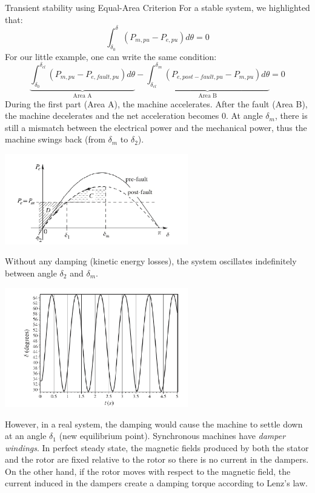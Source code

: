 \begin{frame}[allowframebreaks]{Transient stability using Equal-Area Criterion}
For a stable system, we highlighted that:
$$\int_{\delta_0}^{\delta} \left(P_{m,pu}-P_{e,pu}\right) d\theta = 0$$
For our little example, one can write the same condition:
$$\underbrace{\int_{\delta_0}^{\delta_{cl}} \left(P_{m,pu}-P_{e,fault,pu}\right) d\theta}_{\text{Area A}} - \underbrace{\int_{\delta_{cl}}^{\delta_{m}} \left(P_{e,post-fault,pu}-P_{m,pu}\right) d\theta}_{\text{Area B}} = 0$$
During the first part (Area A), the machine accelerates. After the fault (Area B), the machine decelerates and the net acceleration becomes 0. At angle $\delta_{m}$, there is still a mismatch between the electrical power and the mechanical power, thus the machine swings back (from $\delta_{m}$ to $\delta_{2}$).
\begin{center}
\includegraphics[width=0.6\textwidth]{images/SwingsBack.png}
\end{center}

Without any damping (kinetic energy losses), the system oscillates indefinitely between angle $\delta_2$ and $\delta_m$.
\begin{center}
\includegraphics[width=0.6\textwidth]{images/RotorOscillation.png}
\end{center}
However, in a real system, the damping would cause the machine to settle down at an angle $\delta_1$ (new equilibrium point).
Synchronous machines have \emph{damper windings}. In perfect steady state, the magnetic fields produced by both the stator and the rotor are fixed relative to the rotor so there is no current in the dampers. On the other hand, if the rotor moves with respect to the magnetic field, the current induced in the dampers create a damping torque according to Lenz's law.
\end{frame}

